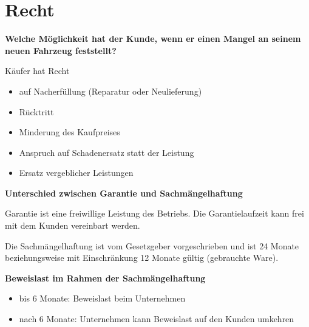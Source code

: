 \newpage

\section{Recht}\label{recht}

\textbf{Welche Möglichkeit hat der Kunde, wenn er einen Mangel an seinem
neuen Fahrzeug feststellt?}

Käufer hat Recht

\begin{itemize}
\item
  auf Nacherfüllung (Reparatur oder Neulieferung)
\item
  Rücktritt
\item
  Minderung des Kaufpreises
\item
  Anspruch auf Schadenersatz statt der Leistung
\item
  Ersatz vergeblicher Leistungen
\end{itemize}

\textbf{Unterschied zwischen Garantie und Sachmängelhaftung}

Garantie ist eine freiwillige Leistung des Betriebs. Die
Garantielaufzeit kann frei mit dem Kunden vereinbart werden.

Die Sachmängelhaftung ist vom Gesetzgeber vorgeschrieben und ist 24
Monate beziehungsweise mit Einschränkung 12 Monate gültig (gebrauchte
Ware).

\textbf{Beweislast im Rahmen der Sachmängelhaftung}

\begin{itemize}
\item
  bis 6 Monate: Beweislast beim Unternehmen
\item
  nach 6 Monate: Unternehmen kann Beweislast auf den Kunden umkehren
\end{itemize}
